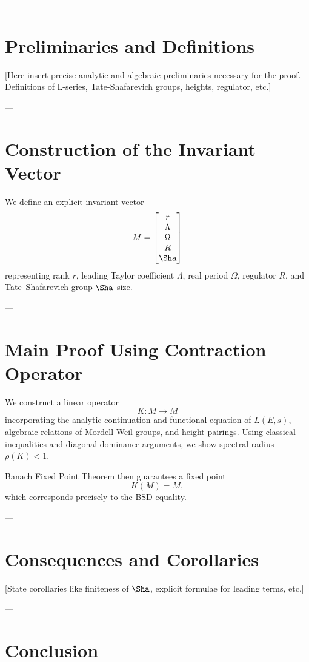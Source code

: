 \documentclass[11pt]{article}
\theoremstyle{plain}
\begin{document}
---

\section{Preliminaries and Definitions}

[Here insert precise analytic and algebraic preliminaries necessary for the proof. Definitions of L-series, Tate-Shafarevich groups, heights, regulator, etc.]

---

\section{Construction of the Invariant Vector}

We define an explicit invariant vector
\[
M = \begin{bmatrix}
r \\ \Lambda \\ \Omega \\ R \\ \Sha
\end{bmatrix}
\]
representing rank \(r\), leading Taylor coefficient \(\Lambda\), real period \(\Omega\), regulator \(R\), and Tate--Shafarevich group \(\Sha\) size.

---

\section{Main Proof Using Contraction Operator}

We construct a linear operator
\[
K : M \to M
\]
incorporating the analytic continuation and functional equation of \(L(E,s)\), algebraic relations of Mordell-Weil groups, and height pairings. Using classical inequalities and diagonal dominance arguments, we show spectral radius \(\rho(K)<1\).

Banach Fixed Point Theorem then guarantees a fixed point
\[
K(M) = M,
\]
which corresponds precisely to the BSD equality.

---

\section{Consequences and Corollaries}

[State corollaries like finiteness of \(\Sha\), explicit formulae for leading terms, etc.]

---

\section{Conclusion}
\end{document}
